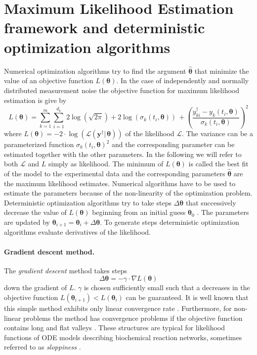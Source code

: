 \documentclass[12pt,a4paper]{scrartcl}
\begin{document}
\section{Maximum Likelihood Estimation framework and deterministic optimization algorithms} \label{sec:det_optimization}
Numerical optimization algorithms try to find the argument $\boldsymbol{\hat \theta}$ that minimize the value of an objective function $L(\boldsymbol{\theta})$. In the case of independently and normally distributed measurement noise the objective function for maximum likelihood estimation is give by
\begin{equation}
	L(\boldsymbol{\theta}) = \sum_{k=1}^m \sum_{i=1}^{d_k}\, 2\log(\sqrt{2 \pi}) + 2\log(\sigma_k(t_i, \boldsymbol{\theta}))\, + \left(\frac{y_{ki}^\dagger - y_{k}(t_{i}, \boldsymbol{\theta})}{\sigma_k(t_i, \boldsymbol{\theta})}\right)^2 \label{llhoodfun2}
\end{equation}
where $L(\boldsymbol{\theta}) =  - 2\cdot \log(\mathcal{L}(\mathbf{y}^\dagger|\,\boldsymbol{\theta}))$ of the likelihood $\mathcal{L}$. The variance can be a parameterized function $\sigma_k(t_i, \boldsymbol{\theta})^2$ and the corresponding parameter can be estimated together with the other parameters. In the following we will refer to both $\mathcal{L}$ and $L$ simply as likelihood. The minimum of $L(\boldsymbol{\theta})$ is called the best fit of the model to the experimental data and the corresponding parameters $\boldsymbol{\hat \theta}$ are the maximum likelihood estimates. Numerical algorithms have to be used to estimate the parameters because of the non-linearity of the optimization problem. Deterministic optimization algorithms try to take steps $\Delta \boldsymbol{\theta}$ that successively decrease the value of $L(\boldsymbol{\theta})$ beginning from an initial guess $\boldsymbol{\theta}_0$ \citep{Press:1990rw}. The parameters are updated by $\boldsymbol{\theta}_{i+1} = \boldsymbol{\theta}_{i} + \Delta \boldsymbol{\theta}$. To generate steps deterministic optimization algorithms evaluate derivatives of the likelihood. 

\paragraph{Gradient descent method.}
The \emph{gradient descent} method takes steps 
\begin{equation}
	\Delta \boldsymbol{\theta} = - \gamma \cdot \nabla L(\boldsymbol{\theta}) \label{gradientstep}
\end{equation}	
down the gradient of $L$. $\gamma$ is chosen sufficiently small such that a decreases in the objective function $L(\boldsymbol{\theta}_{i+1}) < L(\boldsymbol{\theta}_{i})$ can be guaranteed. It is well known that this simple method exhibits only linear convergence rate \citep{Stoer:2005fk}. Furthermore, for non-linear problems the method has convergence problems if the objective function contains long and flat valleys \citep{Rosenbrock:1960fk}. These structures are typical for likelihood functions of ODE models describing biochemical reaction networks, sometimes referred to as \emph{sloppiness} \citep{Gutenkunst:2007ct}. 
\end{document}
